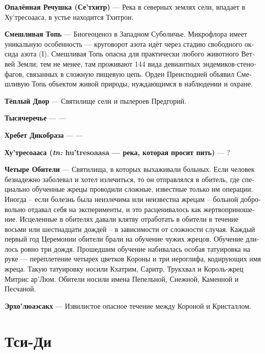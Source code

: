 \documentclass[a4paper,12pt,fleqn]{book}\usepackage{polyglossia}\setdefaultlanguage[babelshorthands=true]{russian}\setotherlanguage{english}\defaultfontfeatures{Ligatures=TeX,Mapping=tex-text}\usepackage{xcolor}\newcommand{\ml}[3]{#2}
\newcommand{\theterm}[3]{\textbf{\hypertarget{#1}{#2}} --- #3}
\newcommand{\theorigin}[3]{\textit{#1:} #2 --- #3}
\begin{document}
\theterm{se-tchitr}
{Опалённая Речушка (Се'тхитр)}
{Река в северных землях сели, впадает в Ху'тресоааса, в устье находится Тхитрон.}

\theterm{risible-swamp}
{Смешливая Топь}
{Биогеоценоз в Западном Суболичье.
Микрофлора имеет уникальную особенность --- круговорот азота идёт через стадию свободного оксида азота (I).
Смешливая Топь опасна для практически любого животного Ветвей Земли;
тем не менее, там проживают 144 вида девиантных эндемиков-стенофагов, связанных в сложную пищевую цепь.
Орден Преисподней объявил Смешливую Топь объектом живой природы, нуждающимся в наблюдении и охране.}

\theterm{sanct2}
{Тёплый Двор}
{Святилище сели и пылероев Предгорий.}

\theterm{rivertangle}
{Тысячеречье}
{---}

\theterm{hedgehog-spine}
{Хребет Дикобраза}
{---}

\theterm{hu-tresoaasa}
{Ху'тресоааса (\theorigin{tn}{hu'tresoaasa}{река, которая просит пить})}
{?}

\theterm{abode}
{Четыре Обители}
{Святилища, в которых выхаживали больных.
Если человек безнадежно заболевал и хотел излечиться, то он отправлялся в обитель, где специально обученные жрецы проводили сложные, известные только им операции.
Иногда -- если болезнь была неизлечима или неизвестна жрецам -- больной добровольно отдавал себя на эксперименты, и это расценивалось как жертвоприношение.
Исцеленные в обителях давали клятву отработать в обители в течение восьми или шестнадцати дождей -- в зависимости от сложности случая.
Каждый первый год Церемонии обители брали на обучение чужих жрецов.
Обучение длилось ровно три дождя.
Прошедшим обучение набивалась особая татуировка на руке --- переплетение четырех цветков Короны и три иероглифа, кодирующих имя жреца.
Такую татуировку носили Кхатрим, Саритр, Трукхвал и Король-жрец Митрис ар'Люм.
Обители носили имена Пепельной, Снежной, Каменной и Песчаной.}

\theterm{oerho-loeaesakch}
{Эрхо'люаэсакх}
{Извилистое опасное течение между Короной и Кристаллом.}

\section{Тси-Ди}
\end{document}
